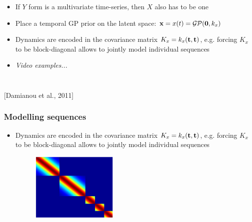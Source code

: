 \documentclass{beamer}
\begin{document}
\begin{frame}
\begin{columns}
\begin{itemize}
  \item<1-> If $Y$ form is a \alert{multivariate time-series}, then $X$ also has to be one
  \vspace{5pt}
  \item<2-> Place a \alert{temporal GP prior} on the latent space: 
    ${\bf x} = x(t) = \mathcal{GP}(\mathbf{0}, k_x)$
\vspace{5pt}
  \item<3-> Dynamics are encoded in the covariance matrix $K_x = k_x({\bf t},{\bf t})$,
     e.g. forcing $K_x$ to be block-diagonal allows to jointly model individual sequences
\vspace{5pt}
 \item<4-> \emph{Video examples...}
\end{itemize}

\end{columns}
\begin{flushright}
\small{
[Damianou et al., 2011]
}
\end{flushright}
\end{frame}


\begin{frame}
\frametitle{Modelling sequences}
\begin{itemize}
   \item  
     Dynamics are encoded in the covariance matrix $K_x = k_x({\bf t},{\bf t})$,
     e.g. forcing $K_x$ to be block-diagonal allows to jointly model individual sequences
    \begin{figure}
    \includegraphics[width=0.4\textwidth]{blockDiagonalCov}
    \end{figure}
\end{itemize}
\end{frame}
\end{document}
